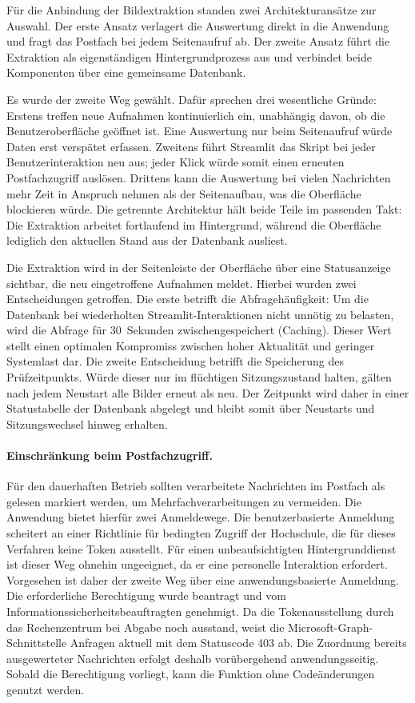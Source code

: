 \documentclass[12pt,a4paper]{report}
\begin{document}
Für die Anbindung der Bildextraktion standen zwei Architekturansätze zur Auswahl. Der erste Ansatz verlagert die Auswertung direkt in die Anwendung und fragt das Postfach bei jedem Seitenaufruf ab. Der zweite Ansatz führt die Extraktion als eigenständigen Hintergrundprozess aus und verbindet beide Komponenten über eine gemeinsame Datenbank.

Es wurde der zweite Weg gewählt. Dafür sprechen drei wesentliche Gründe:
Erstens treffen neue Aufnahmen kontinuierlich ein, unabhängig davon, ob die Benutzeroberfläche geöffnet ist. Eine Auswertung nur beim Seitenaufruf würde Daten erst verspätet erfassen. Zweitens führt Streamlit das Skript bei jeder Benutzerinteraktion neu aus; jeder Klick würde somit einen erneuten Postfachzugriff auslösen. Drittens kann die Auswertung bei vielen Nachrichten mehr Zeit in Anspruch nehmen als der Seitenaufbau, was die Oberfläche blockieren würde. Die getrennte Architektur hält beide Teile im passenden Takt: Die Extraktion arbeitet fortlaufend im Hintergrund, während die Oberfläche lediglich den aktuellen Stand aus der Datenbank ausliest.

Die Extraktion wird in der Seitenleiste der Oberfläche über eine Statusanzeige sichtbar, die neu eingetroffene Aufnahmen meldet. Hierbei wurden zwei Entscheidungen getroffen. Die erste betrifft die Abfragehäufigkeit: Um die Datenbank bei wiederholten Streamlit-Interaktionen nicht unnötig zu belasten, wird die Abfrage für 30~Sekunden zwischengespeichert (Caching). Dieser Wert stellt einen optimalen Kompromiss zwischen hoher Aktualität und geringer Systemlast dar. Die zweite Entscheidung betrifft die Speicherung des Prüfzeitpunkts. Würde dieser nur im flüchtigen Sitzungszustand halten, gälten nach jedem Neustart alle Bilder erneut als neu. Der Zeitpunkt wird daher in einer Statustabelle der Datenbank abgelegt und bleibt somit über Neustarts und Sitzungswechsel hinweg erhalten.

\paragraph{Einschränkung beim Postfachzugriff.} 
Für den dauerhaften Betrieb sollten verarbeitete Nachrichten im Postfach als gelesen markiert werden, um Mehrfachverarbeitungen zu vermeiden. Die Anwendung bietet hierfür zwei Anmeldewege. Die benutzerbasierte Anmeldung scheitert an einer Richtlinie für bedingten Zugriff der Hochschule, die für dieses Verfahren keine Token ausstellt. Für einen unbeaufsichtigten Hintergrunddienst ist dieser Weg ohnehin ungeeignet, da er eine personelle Interaktion erfordert. Vorgesehen ist daher der zweite Weg über eine anwendungsbasierte Anmeldung. Die erforderliche Berechtigung wurde beantragt und vom Informationssicherheitsbeauftragten genehmigt. Da die Tokenausstellung durch das Rechenzentrum bei Abgabe noch ausstand, weist die Microsoft-Graph-Schnittstelle Anfragen aktuell mit dem Statuscode 403 ab. Die Zuordnung bereits ausgewerteter Nachrichten erfolgt deshalb vorübergehend anwendungsseitig. Sobald die Berechtigung vorliegt, kann die Funktion ohne Codeänderungen genutzt werden.
\end{document}
